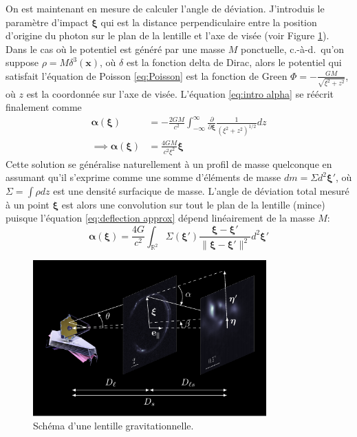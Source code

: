 On est maintenant en mesure de calculer l'angle de déviation. 
J'introduis le paramètre d'impact $\boldsymbol{\xi}$ qui est la distance perpendiculaire entre 
la position d'origine du photon sur le plan de la lentille  
et l'axe de visée (voir Figure \ref{fig:cartoon}).
Dans le cas où le potentiel est généré par une masse $M$ ponctuelle, c.-à-d.\ qu'on 
suppose $\rho = M\delta^{3}(\mathbf{x})$, où $\delta $ est la fonction delta de Dirac, 
alors le potentiel qui satisfait l'équation de Poisson \eqref{eq:Poisson} est 
la fonction de Green 
$\displaystyle \Phi = -\frac{GM}{\sqrt{ \xi^{2} + z^{2}}}$, où $z$ est la coordonnée 
sur l'axe de visée. L'équation \eqref{eq:intro alpha} se réécrit finalement comme 
\begin{align}
\nonumber
        \boldsymbol{ \alpha}(\boldsymbol{ \xi} ) &= -\frac{2GM}{c^{2}} \int_{-\infty }^{\infty }  \frac{\partial}{\partial \boldsymbol{\xi} }\frac{1}{(\xi^{2} + z^{2})^{1/2}}dz \\
\label{eq:deflection approx}
        \implies \boldsymbol{ \alpha}(\boldsymbol{ \xi})  &= \frac{4GM}{c^{2}  \xi^{2} } \boldsymbol{ \xi}
\end{align} 
Cette solution se généralise naturellement à un profil de masse quelconque en assumant 
qu'il s'exprime comme une somme d'éléments de masse $dm = \Sigma d^{2}\boldsymbol{ \xi}'$, 
où $\Sigma = \int \rho dz$ est une densité surfacique de masse. 
L'angle de déviation total mesuré à un point $\boldsymbol{\xi} $ est alors une convolution 
sur tout le plan de la lentille (mince) puisque l'équation \eqref{eq:deflection approx} dépend 
linéairement de la masse $M$:
\begin{equation}\label{eq:alpha physique}
        \boldsymbol{ \alpha} (\boldsymbol{ \xi} ) = \frac{4 G}{c^{2}} 
        \int_{\mathbb{R}^{2}} \Sigma (\boldsymbol{ \xi} ')
        \frac{\boldsymbol{ \xi}  - \boldsymbol{ \xi} '}{\lVert \boldsymbol{ \xi}  - \boldsymbol{ \xi} ' \rVert^{2}}d^{2}\boldsymbol{ \xi} '
\end{equation} 

\begin{figure}[tb!]
        \centering
        \includegraphics[width=0.8\textwidth]{figures/lensing_cartoon}
        \caption{Schéma d'une lentille gravitationnelle.}
        \label{fig:cartoon}
\end{figure}


